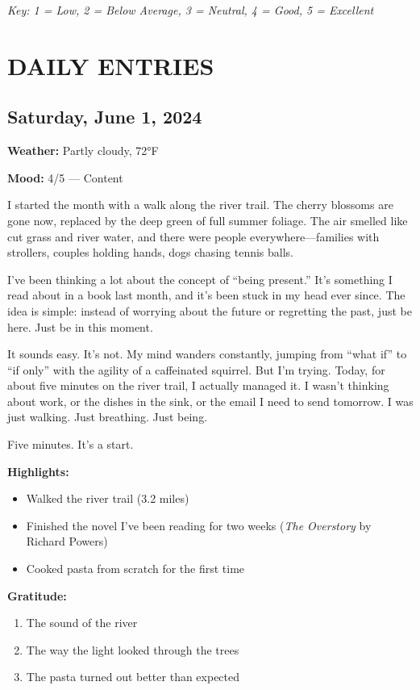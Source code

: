 \documentclass[
    language=english,
    doctype=journal,
    institution=none,
]{../../omnilatex}
\begin{document}
\noindent\textit{Key: 1 = Low, 2 = Below Average, 3 = Neutral, 4 = Good, 5 = Excellent}

\section*{DAILY ENTRIES}

\subsection{Saturday, June 1, 2024}

\textbf{Weather:} Partly cloudy, 72°F

\textbf{Mood:} 4/5 --- Content

I started the month with a walk along the river trail. The cherry blossoms are gone now, replaced by the deep green of full summer foliage. The air smelled like cut grass and river water, and there were people everywhere---families with strollers, couples holding hands, dogs chasing tennis balls.

I've been thinking a lot about the concept of ``being present.'' It's something I read about in a book last month, and it's been stuck in my head ever since. The idea is simple: instead of worrying about the future or regretting the past, just be here. Just be in this moment.

It sounds easy. It's not. My mind wanders constantly, jumping from ``what if'' to ``if only'' with the agility of a caffeinated squirrel. But I'm trying. Today, for about five minutes on the river trail, I actually managed it. I wasn't thinking about work, or the dishes in the sink, or the email I need to send tomorrow. I was just walking. Just breathing. Just being.

Five minutes. It's a start.

\textbf{Highlights:}
\begin{itemize}
    \item Walked the river trail (3.2 miles)
    \item Finished the novel I've been reading for two weeks (\textit{The Overstory} by Richard Powers)
    \item Cooked pasta from scratch for the first time
\end{itemize}

\textbf{Gratitude:}
\begin{enumerate}
    \item The sound of the river
    \item The way the light looked through the trees
    \item The pasta turned out better than expected
\end{enumerate}
\end{document}
